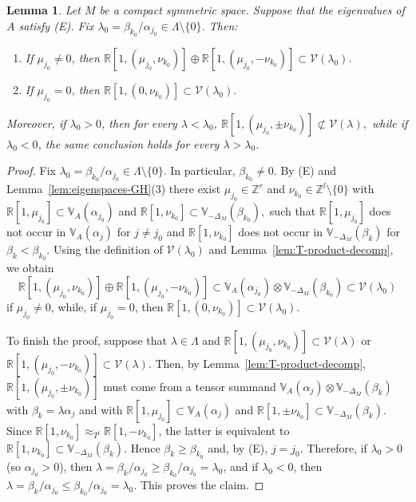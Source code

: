 \documentclass[reqno,twoside,12pt]{amsart}
\newtheorem{Lemma}[Remark]{Lemma}
\newcommand{\bR}{\mathbb{R}}
\newcommand{\bV}{\mathbb{V}}
\newcommand{\cV}{\mathcal{V}}
\numberwithin{equation}{section} \errorcontextlines=0
\begin{document}
\begin{Lemma}\label{lem:highest}
Let $M$ be a compact symmetric space. Suppose that the eigenvalues of $A$ satisfy \textnormal{(E)}.
Fix $\lambda_0=\beta_{k_0}/\alpha_{j_0}\in\Lambda\setminus\{0\}$. Then:
\begin{enumerate}
\item If $\mu_{j_0}\neq 0$, then
$
\bR[1,(\mu_{j_0},\nu_{k_0})]\oplus \bR[1,(\mu_{j_0},-\nu_{k_0})]\subset \cV(\lambda_0).
$
\item If $\mu_{j_0}=0$, then
$
\bR[1,(0,\nu_{k_0})]\subset \cV(\lambda_0).
$
\end{enumerate}
Moreover, if  $\lambda_0>0$, then for every $\lambda<\lambda_0$,
$
\bR[1,(\mu_{j_0},\pm\nu_{k_0})]\not\subset \cV(\lambda),$
while if $\lambda_0<0$, the same conclusion holds for every $\lambda>\lambda_0$.
\end{Lemma}

\begin{proof}
Fix $\lambda_0=\beta_{k_0}/\alpha_{j_0}\in\Lambda\setminus\{0\}$. In particular, $\beta_{k_0}\neq 0$.
By (E) and Lemma~\ref{lem:eigenspaces-GH}(3) there exist
$\mu_{j_0}\in\mathbb{Z}^r$ and $\nu_{k_0}\in\mathbb{Z}^l\setminus\{0\}$ with
$
\bR[1,\mu_{j_0}]\subset \bV_A(\alpha_{j_0})$ and
$\bR[1,\nu_{k_0}]\subset \bV_{-\Delta_M}(\beta_{k_0}),
$
such that $\bR[1,\mu_{j_0}]$ does not occur in $\bV_A(\alpha_j)$ for $j\ne j_0$ and
$\bR[1,\nu_{k_0}]$ does not occur in $\bV_{-\Delta_M}(\beta_k)$ for $\beta_k<\beta_{k_0}$.
Using the definition of $\cV(\lambda_0)$  and
Lemma~\ref{lem:T-product-decomp}, we obtain
\[
\bR[1,(\mu_{j_0},\nu_{k_0})]\oplus \bR[1,(\mu_{j_0},-\nu_{k_0})]\subset
\bV_A(\alpha_{j_0})\otimes \bV_{-\Delta_M}(\beta_{k_0})
\subset \cV(\lambda_0)
\]
if $\mu_{j_0}\neq 0$, while, if $\mu_{j_0}=0$, then
$
\bR[1,(0,\nu_{k_0})]\subset \cV(\lambda_0).
$

To finish the proof, suppose that $\lambda\in\Lambda$ and $\bR[1,(\mu_{j_0},\nu_{k_0})]\subset \cV(\lambda)$ or $\bR[1,(\mu_{j_0},-\nu_{k_0})]\subset \cV(\lambda)$. Then, by Lemma~\ref{lem:T-product-decomp}, $\bR[1,(\mu_{j_0},\pm\nu_{k_0})]$ must come from a tensor summand $\bV_A(\alpha_j)\otimes \bV_{-\Delta_M}(\beta_k)$ with $\beta_k=\lambda\alpha_j$ and with $\bR[1,\mu_{j_0}]\subset \bV_A(\alpha_j)$ and $\bR[1,\pm\nu_{k_0}]\subset \bV_{-\Delta_M}(\beta_k)$. Since $\bR[1,\nu_{k_0}]\approx_{T^l}\bR[1,-\nu_{k_0}]$, the latter is equivalent to $\bR[1,\nu_{k_0}]\subset \bV_{-\Delta_M}(\beta_k)$. Hence $\beta_k\ge \beta_{k_0}$ and, by (E), $j=j_0$. Therefore, if $\lambda_0>0$ (so $\alpha_{j_0}>0$), then $\lambda=\beta_k/\alpha_{j_0}\ge \beta_{k_0}/\alpha_{j_0}=\lambda_0$, and if $\lambda_0<0$, then $\lambda=\beta_k/\alpha_{j_0}\le \beta_{k_0}/\alpha_{j_0}=\lambda_0$. This proves the claim.
\end{proof}
\end{document}
